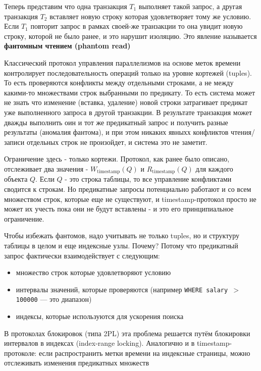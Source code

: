 Теперь представим что одна транзакция $T_1$ выполняет такой запрос, а другая транзакция $T_2$ вставляет новую строку которая удовлетворяет тому же условию. Если $T_1$ повторит запрос в рамках своей-же транзакции то она увидит новую строку, которой не было ранее, и это нарушит изоляцию. Это явление называется \textbf{фантомным чтением (phantom read)}

Классический протокол управления параллелизмов на основе меток времени контролирует последовательность операций только на уровне кортежей (tuples). То есть проверяются конфликты между отдельными строками, а не между какими-то множествами строк выбранными по предикату.
То есть система может не знать что изменение (вставка, удаление) новой строки затрагивает предикат уже выполненного запроса в другой транзакции. В результате транзакция может дважды выполнить оин и тот же предикатный запрос и получить разные результаты (аномалия фантома), и при этом никаких явныхх конфликтов чтения/записи отдельных строк не произойдет, и система это не заметит.

Ограничение здесь - только кортежи. Протокол, как ранее было описано, отслеживает два значения - $W_{\text{timestamp}}(Q)$ и $R_{\text{timestamp}}(Q)$ для каждого объекта $Q$. Если $Q$ - это строка таблицы, то все управление конфликтами сводится к строкам. Но предикатные запросы потенциально работают и со всем множеством строк, которые еще не существуют, и timestamp-протокол просто не может их учесть пока они не будут вставлены - и это его принципиальное ограничение.

Чтобы избежать фантомов, надо учитывать не только tuples, но и структуру таблицы в целом и еще индексные узлы. Почему?
Потому что предикатный запрос фактически взаимодействует с следующим:
\begin{itemize}
    \item множество строк которые удовлетворяют условию
    \item интервалы значений, которые проверяются (например \texttt{WHERE salary $>$ 100000} — это диапазон)
    \item индексы, которые используются для ускорения поиска
\end{itemize}

В протоколах блокировок (типа 2PL) эта проблема решается путём блокировки интервалов в индексах (index-range locking). Аналогично и в timestamp-протоколе: если распространить метки времени на индексные страницы, можно отслеживать изменения предикатных множеств \autocite{Silberschatz, ElmasriNavathe}

